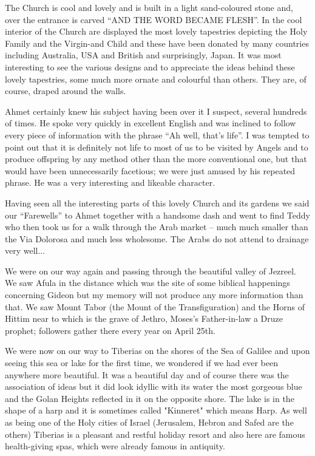 The Church is cool and lovely and is built in a light sand-coloured
stone and, over the entrance is carved ``AND THE WORD BECAME
FLESH''. In the cool interior of the Church are displayed the most
lovely tapestries depicting the Holy Family and the Virgin-and Child
and these have been donated by many countries including Australia, USA
and British and surprisingly, Japan. It was most interesting to see
the various designs and to appreciate the ideas behind these lovely
tapestries, some much more ornate and colourful than others.  They
are, of course, draped around the walls.


Ahmet certainly knew his subject having been over it I suspect,
several hundreds of times. He spoke very quickly in excellent English
and was inclined to follow every piece of information with the phrase
``Ah well, that's life''. I was tempted to point out that it is
definitely not life to most of us to be visited by Angels and to
produce offspring by any method other than the more conventional one,
but that would have been unnecessarily facetious; we were just amused
by his repeated phrase. He was a very interesting and likeable
character.

Having seen all the interesting parts of this lovely Church and its
gardens we said our ``Farewells'' to Ahmet together with a handsome
dash and went to find Teddy who then took us for a walk through the
Arab market -- much much smaller than the Via Dolorosa and much less
wholesome. The Arabs do not attend to drainage very well...

We were on our way again and passing through the beautiful valley of
Jezreel. We saw Afula in the distance which was the site of some
biblical happenings concerning Gideon but my memory will not produce
any more information than that. We saw Mount Tabor (the Mount of the
Transfiguration) and the Horns of Hittim near to which is the grave of
Jethro, Moses's Father-in-law a Druze prophet; followers gather there
every year on April 25th.

We were now on our way to Tiberias on the shores of the Sea of Galilee
and upon seeing this sea or lake for the first time, we wondered if we
had ever been anywhere more beautiful. It was a beautiful day and of
course there was the association of ideas but it did look idyllic with
its water the most gorgeous blue and the Golan Heights reflected in it
on the opposite shore. The lake is in the shape of a harp and it is
sometimes called "Kinneret" which means Harp. As well as being one of
the Holy cities of Israel (Jerusalem, Hebron and Safed are the others)
Tiberias is a pleasant and restful holiday resort and also here are
famous health-giving spas, which were already famous in antiquity.

